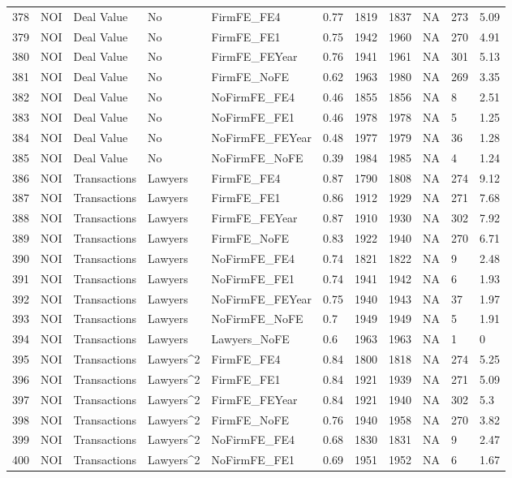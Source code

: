 \begin{table}[ht]
\begin{tabular}{rllllllllll}
  378 & NOI & Deal Value & No & FirmFE\_FE4 & 0.77 & 1819 & 1837 & NA & 273 & 5.09 \\ 
  379 & NOI & Deal Value & No & FirmFE\_FE1 & 0.75 & 1942 & 1960 & NA & 270 & 4.91 \\ 
  380 & NOI & Deal Value & No & FirmFE\_FEYear & 0.76 & 1941 & 1961 & NA & 301 & 5.13 \\ 
  381 & NOI & Deal Value & No & FirmFE\_NoFE & 0.62 & 1963 & 1980 & NA & 269 & 3.35 \\ 
  382 & NOI & Deal Value & No & NoFirmFE\_FE4 & 0.46 & 1855 & 1856 & NA & 8 & 2.51 \\ 
  383 & NOI & Deal Value & No & NoFirmFE\_FE1 & 0.46 & 1978 & 1978 & NA & 5 & 1.25 \\ 
  384 & NOI & Deal Value & No & NoFirmFE\_FEYear & 0.48 & 1977 & 1979 & NA & 36 & 1.28 \\ 
  385 & NOI & Deal Value & No & NoFirmFE\_NoFE & 0.39 & 1984 & 1985 & NA & 4 & 1.24 \\ 
  386 & NOI & Transactions & Lawyers & FirmFE\_FE4 & 0.87 & 1790 & 1808 & NA & 274 & 9.12 \\ 
  387 & NOI & Transactions & Lawyers & FirmFE\_FE1 & 0.86 & 1912 & 1929 & NA & 271 & 7.68 \\ 
  388 & NOI & Transactions & Lawyers & FirmFE\_FEYear & 0.87 & 1910 & 1930 & NA & 302 & 7.92 \\ 
  389 & NOI & Transactions & Lawyers & FirmFE\_NoFE & 0.83 & 1922 & 1940 & NA & 270 & 6.71 \\ 
  390 & NOI & Transactions & Lawyers & NoFirmFE\_FE4 & 0.74 & 1821 & 1822 & NA & 9 & 2.48 \\ 
  391 & NOI & Transactions & Lawyers & NoFirmFE\_FE1 & 0.74 & 1941 & 1942 & NA & 6 & 1.93 \\ 
  392 & NOI & Transactions & Lawyers & NoFirmFE\_FEYear & 0.75 & 1940 & 1943 & NA & 37 & 1.97 \\ 
  393 & NOI & Transactions & Lawyers & NoFirmFE\_NoFE & 0.7 & 1949 & 1949 & NA & 5 & 1.91 \\ 
  394 & NOI & Transactions & Lawyers & Lawyers\_NoFE & 0.6 & 1963 & 1963 & NA & 1 & 0 \\ 
  395 & NOI & Transactions & Lawyers^2 & FirmFE\_FE4 & 0.84 & 1800 & 1818 & NA & 274 & 5.25 \\ 
  396 & NOI & Transactions & Lawyers^2 & FirmFE\_FE1 & 0.84 & 1921 & 1939 & NA & 271 & 5.09 \\ 
  397 & NOI & Transactions & Lawyers^2 & FirmFE\_FEYear & 0.84 & 1921 & 1940 & NA & 302 & 5.3 \\ 
  398 & NOI & Transactions & Lawyers^2 & FirmFE\_NoFE & 0.76 & 1940 & 1958 & NA & 270 & 3.82 \\ 
  399 & NOI & Transactions & Lawyers^2 & NoFirmFE\_FE4 & 0.68 & 1830 & 1831 & NA & 9 & 2.47 \\ 
  400 & NOI & Transactions & Lawyers^2 & NoFirmFE\_FE1 & 0.69 & 1951 & 1952 & NA & 6 & 1.67 \\ 
   \hline
\end{tabular}
\end{table}
